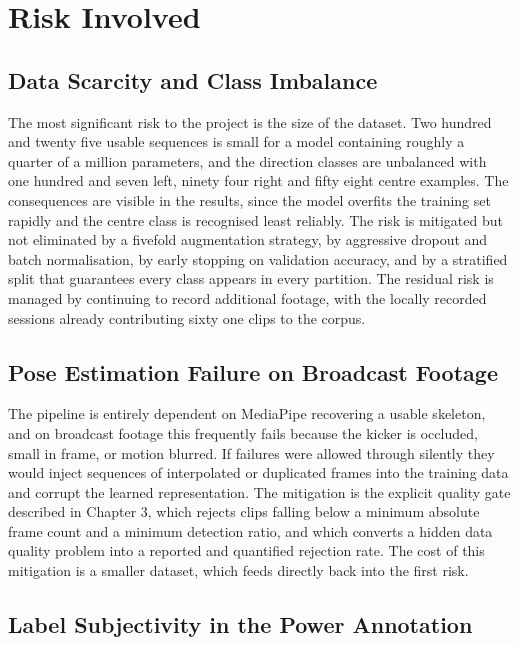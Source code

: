 \section{Risk Involved}

\subsection{Data Scarcity and Class Imbalance}

The most significant risk to the project is the size of the dataset. Two hundred and twenty five usable sequences is small for a model containing roughly a quarter of a million parameters, and the direction classes are unbalanced with one hundred and seven left, ninety four right and fifty eight centre examples. The consequences are visible in the results, since the model overfits the training set rapidly and the centre class is recognised least reliably. The risk is mitigated but not eliminated by a fivefold augmentation strategy, by aggressive dropout and batch normalisation, by early stopping on validation accuracy, and by a stratified split that guarantees every class appears in every partition. The residual risk is managed by continuing to record additional footage, with the locally recorded sessions already contributing sixty one clips to the corpus.

\subsection{Pose Estimation Failure on Broadcast Footage}

The pipeline is entirely dependent on MediaPipe recovering a usable skeleton, and on broadcast footage this frequently fails because the kicker is occluded, small in frame, or motion blurred. If failures were allowed through silently they would inject sequences of interpolated or duplicated frames into the training data and corrupt the learned representation. The mitigation is the explicit quality gate described in Chapter 3, which rejects clips falling below a minimum absolute frame count and a minimum detection ratio, and which converts a hidden data quality problem into a reported and quantified rejection rate. The cost of this mitigation is a smaller dataset, which feeds directly back into the first risk.

\subsection{Label Subjectivity in the Power Annotation}


